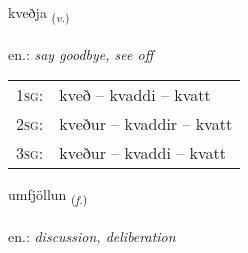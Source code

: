 \documentclass[frontgrid, backgrid]{flacards}\usepackage[]{graphicx}\usepackage[]{xcolor}
\begin{document}
\renewcommand{\flhead}{\vskip5pt \fboxsep=0pt {\small\bfseries\footnotesize Sagnorð | Verb}}
\renewcommand{\fcfoot}{\vskip5pt \fboxsep=0pt \hspace{2pt}{\small\bfseries\footnotesize 1K}}

\renewcommand{\blhead}{\vskip5pt {\small\bfseries\footnotesize Sagnorð | Verb }}
\renewcommand{\bcfoot}{\vskip5pt \hspace{2pt}{\small\bfseries\footnotesize 1K}}


{kveðja \small{\textsubscript{(\textit{v.})}} \\[1ex] %
\textphonetic{[kʰvɛðja]} \\
en.: \emph{say goodbye, see off} \\  [2ex]
\renewcommand*{\arraystretch}{0.8}
\begin{tabular}{p{1cm}l}
\textsc{1sg}: & kveð -- kvaddi -- kvatt \\ 
\textsc{2sg}: & kveður -- kvaddir -- kvatt \\ 
\textsc{3sg}: & kveður -- kvaddi -- kvatt \\ 
\end{tabular}
}

\renewcommand{\flhead}{\vskip5pt \fboxsep=0pt {\small\bfseries\footnotesize Nafnorð | Noun}}
\renewcommand{\fcfoot}{\vskip5pt \fboxsep=0pt \hspace{2pt}{\small\bfseries\footnotesize 1K}}

\renewcommand{\blhead}{\vskip5pt {\small\bfseries\footnotesize Nafnorð | Noun }}
\renewcommand{\bcfoot}{\vskip5pt \hspace{2pt}{\small\bfseries\footnotesize 1K}}


{umfjöllun \small{\textsubscript{(\textit{f.})}} \\[1ex] %
\textphonetic{[ʏmfjœtlʏn]} \\
en.: \emph{discussion, deliberation} \\  [2ex]
\renewcommand*{\arraystretch}{0.8}
}
\end{document}
